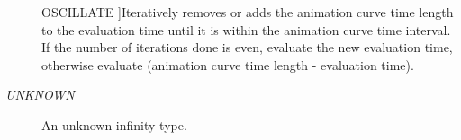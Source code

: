 \begin{Desc}
\begin{description}
{\hypertarget{namespaceFUDaeInfinity_a9d8fb86affe94d1586d728d4c2e89008a0d3203b302bb15b8b3e11d1e36ec10e6}{
OSCILLATE}
\label{namespaceFUDaeInfinity_a9d8fb86affe94d1586d728d4c2e89008a0d3203b302bb15b8b3e11d1e36ec10e6}
}]Iteratively removes or adds the animation curve time length to the evaluation time until it is within the animation curve time interval. If the number of iterations done is even, evaluate the new evaluation time, otherwise evaluate (animation curve time length -\/ evaluation time). \item[{\em 
\hypertarget{namespaceFUDaeInfinity_a9d8fb86affe94d1586d728d4c2e89008aefd6eeedc4578e0016ecec2ef88d7835}{
UNKNOWN}
\label{namespaceFUDaeInfinity_a9d8fb86affe94d1586d728d4c2e89008aefd6eeedc4578e0016ecec2ef88d7835}
}]An unknown infinity type. \end{description}
\end{Desc}




